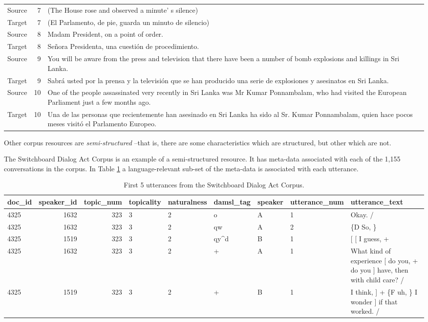 \documentclass[
]{article}
\begin{document}
\begin{table}
\begin{tabular}[t]{lrl}
Source & 7 & (The House rose and observed a minute' s silence)\\
Target & 7 & (El Parlamento, de pie, guarda un minuto de silencio)\\
Source & 8 & Madam President, on a point of order.\\
\addlinespace
Target & 8 & Señora Presidenta, una cuestión de procedimiento.\\
Source & 9 & You will be aware from the press and television that there have been a number of bomb explosions and killings in Sri Lanka.\\
Target & 9 & Sabrá usted por la prensa y la televisión que se han producido una serie de explosiones y asesinatos en Sri Lanka.\\
Source & 10 & One of the people assassinated very recently in Sri Lanka was Mr Kumar Ponnambalam, who had visited the European Parliament just a few months ago.\\
Target & 10 & Una de las personas que recientemente han asesinado en Sri Lanka ha sido al Sr. Kumar Ponnambalam, quien hace pocos meses visitó el Parlamento Europeo.\\
\bottomrule
\end{tabular}
\end{table}

Other corpus resources are \emph{semi-structured} --that is, there are some characteristics which are structured, but other which are not.

The Switchboard Dialog Act Corpus is an example of a semi-structured resource. It has meta-data associated with each of the 1,155 conversations in the corpus. In Table \ref{tab:structure-swda} a language-relevant sub-set of the meta-data is associated with each utterance.

\begin{table}

\caption{\label{tab:structure-swda}First 5 utterances from the Switchboard Dialog Act Corpus.}
\centering
\begin{tabular}[t]{lrrllllll}
\toprule
doc\_id & speaker\_id & topic\_num & topicality & naturalness & damsl\_tag & speaker & utterance\_num & utterance\_text\\
\midrule
4325 & 1632 & 323 & 3 & 2 & o & A & 1 & Okay.  /\\
4325 & 1632 & 323 & 3 & 2 & qw & A & 2 & \{D So, \}\\
4325 & 1519 & 323 & 3 & 2 & qy\textasciicircum{}d & B & 1 & {}[ [ I guess, +\\
4325 & 1632 & 323 & 3 & 2 & + & A & 1 & What kind of experience [ do you, + do you ] have, then with child care? /\\
4325 & 1519 & 323 & 3 & 2 & + & B & 1 & I think, ] + \{F uh, \} I wonder ] if that worked. /\\
\bottomrule
\end{tabular}
\end{table}
\end{document}
